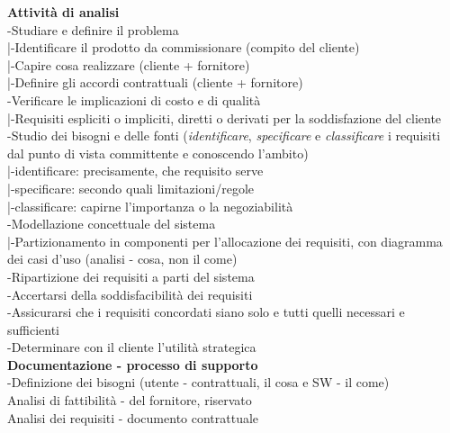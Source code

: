 \documentclass{article}
\begin{document}
		\textbf{Attività di analisi}\\
		-Studiare e definire il problema\\
		|-Identificare il prodotto da commissionare (compito del cliente)\\
		|-Capire cosa realizzare (cliente + fornitore)\\
		|-Definire gli accordi contrattuali (cliente + fornitore)\\
		-Verificare le implicazioni di costo e di qualità\\
		|-Requisiti espliciti o impliciti, diretti o derivati per la soddisfazione del cliente\\
		-Studio dei bisogni e delle fonti (\textit{identificare}, \textit{specificare} e \textit{classificare} i requisiti dal punto di vista committente e conoscendo l'ambito)\\
		|-identificare: precisamente, che requisito serve\\
		|-specificare: secondo quali limitazioni/regole\\
		|-classificare: capirne l'importanza o la negoziabilità\\
		-Modellazione concettuale del sistema\\
		|-Partizionamento in componenti per l'allocazione dei requisiti, con diagramma dei casi d'uso (analisi - cosa, non il come)\\
		-Ripartizione dei requisiti a parti del sistema\\
		-Accertarsi della soddisfacibilità dei requisiti\\
		-Assicurarsi che i requisiti concordati siano solo e tutti quelli necessari e sufficienti\\
		-Determinare con il cliente l'utilità strategica\\
		
		\textbf{Documentazione - processo di supporto}\\
		-Definizione dei bisogni (utente - contrattuali, il cosa e SW - il come)\\
		Analisi di fattibilità - del fornitore, riservato\\
		Analisi dei requisiti - documento contrattuale\\
		
\end{document}
